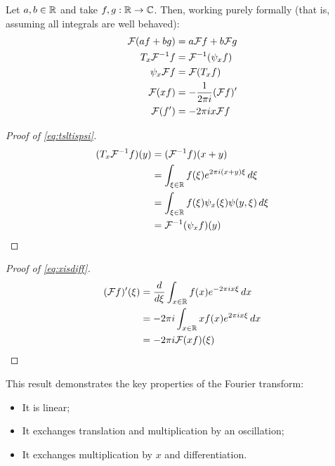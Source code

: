       \begin{lemma}
        \label{lemma:fourprops}
        Let $a,b\in\mathbb{R}$ and take $f,g:\mathbb{R}\rightarrow\mathbb{C}$.
        Then, working purely formally (that is, assuming all integrals are well behaved):
        \begin{align}
          \mathcal{F}(af + bg) &= a\mathcal{F} f + b\mathcal{F} g\\
          \label{eq:tsltispsi}
            T_x\mathcal{F}^{-1}f &= \mathcal{F}^{-1}(\psi_xf)\\
          \label{eq:tsltispsi2}
          \psi_x\mathcal{F} f &= \mathcal{F}(T_xf)\\
          \label{eq:xisdiff}
            \mathcal{F}(xf) &= -\frac{1}{2\pi i}(\mathcal{F} f)'\\
          \label{eq:xisdiff2}
            \mathcal{F}(f') &= -2\pi ix\mathcal{F} f
        \end{align}
        \begin{proof}[Proof of \eqref{eq:tsltispsi}]
          \begin{align*}
            (T_x\mathcal{F}^{-1}f)(y) &= (\mathcal{F}^{-1}f)(x+y)\\
            &= \int_{\xi\in\mathbb{R}}f(\xi)e^{2\pi i(x+y)\xi}\,d\xi\\
            &= \int_{\xi\in\mathbb{R}}f(\xi)\psi_x(\xi)\psi(y,\xi)\,d\xi\\
            &= \mathcal{F}^{-1}(\psi_xf)(y)
          \end{align*}
        \end{proof}
        \begin{proof}[Proof of \eqref{eq:xisdiff}]
          \begin{align*}
            (\mathcal{F} f)'(\xi) &= \frac{d}{d\xi}\int_{x\in\mathbb{R}} f(x)e^{-2\pi i x\xi}\,dx\\
            &= -2\pi i \int_{x\in\mathbb{R}} xf(x)e^{2\pi i x\xi}\,dx\\
            &= -2\pi i\mathcal{F}(xf)(\xi)
          \end{align*}
        \end{proof}
      \end{lemma}
      This result demonstrates the key properties of the Fourier transform:
      \begin{itemize}
        \item It is linear;
        \item It exchanges translation and multiplication by an oscillation;
        \item It exchanges multiplication by $x$ and differentiation.
      \end{itemize}

